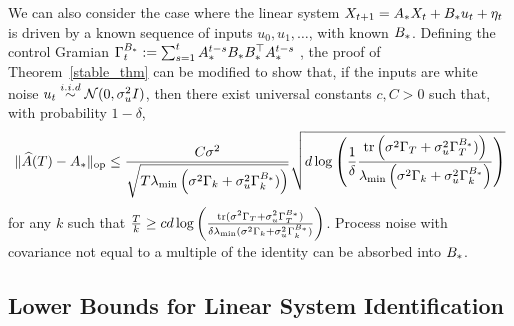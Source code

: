 \begin{remark} We can also consider the case where the linear system $X_{t + 1} = A_{*} X_t + B_{*} u_t + \eta_t$ is driven by a known sequence of inputs $u_0,u_1,\dots$, with known $B_{*}$. Defining the control Gramian $\Gamma^{B_*}_t := \sum_{s=1}^t A_{*}^{t-s}B_{*}B_{*}^\top A_{*}^{t-s}~$, the proof of Theorem~\ref{stable_thm} can be modified to show that, if the inputs are white noise $u_t \overset{i.i.d}{\sim} \mathcal{N}(0,\sigma_u^2 I)$, then there exist universal constants $c,C > 0$ such that, with probability $1-\delta$,
\begin{align*}
\lVert \widehat{A}(T)-A_{*} \rVert_{\mathrm{op}} \le \frac{C\sigma^2}{\sqrt{T\lambda_{\min}\left(\sigma^2\Gamma_k + \sigma_u^2 \Gamma^{B_*}_k)\right)}}\sqrt{d\log\left(\frac{1}{\delta} \frac{\operatorname{tr} \left(\sigma^2\Gamma_T + \sigma_u^2 \Gamma^{B_*}_T)\right)}{\lambda_{\min}\left(\sigma^2\Gamma_k + \sigma_u^2 \Gamma^{B_*}_k\right)}\right)}
\end{align*}
for any $k$ such that $\frac{T}{k} \ge cd\log \left( \frac{\operatorname{tr}(\sigma^2\Gamma_T + \sigma_u^2 \Gamma^{B_*}_T)}{\delta\lambda_{\min}(\sigma^2\Gamma_k + \sigma_u^2 \Gamma^{B_*}_k)} \right)$. Process noise with covariance not equal to a multiple of the identity can be absorbed into $B_{*}$. 
\end{remark}

\subsection{Lower Bounds for Linear System Identification}
\label{sec:lower_bounds}

